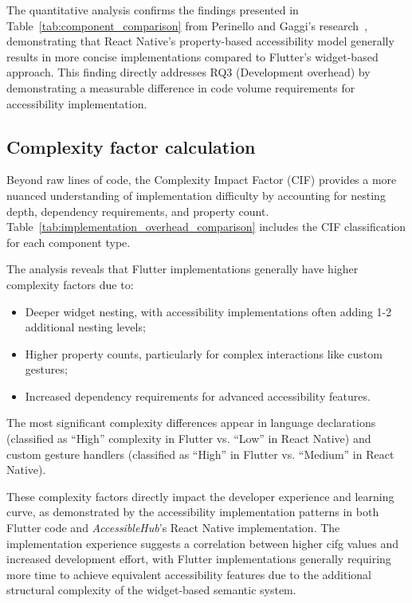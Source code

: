 {The quantitative analysis confirms the findings presented in Table~\ref{tab:component_comparison} from Perinello and Gaggi's research~\cite{perinello2024accessibility}, demonstrating that React Native's property-based accessibility model generally results in more concise implementations compared to Flutter's widget-based approach. This finding directly addresses RQ3 (Development overhead) by demonstrating a measurable difference in code volume requirements for accessibility implementation.

\subsection{Complexity factor calculation}
\label{subsec:complexity-calculation}

Beyond raw lines of code, the Complexity Impact Factor (CIF) provides a more nuanced understanding of implementation difficulty by accounting for nesting depth, dependency requirements, and property count. Table~\ref{tab:implementation_overhead_comparison} includes the CIF classification for each component type.

The analysis reveals that Flutter implementations generally have higher complexity factors due to:

\begin{itemize}
    \item Deeper widget nesting, with accessibility implementations often adding 1-2 additional nesting levels;
    \item Higher property counts, particularly for complex interactions like custom gestures;
    \item Increased dependency requirements for advanced accessibility features.
\end{itemize}

The most significant complexity differences appear in language declarations (classified as ``High'' complexity in Flutter vs. ``Low'' in React Native) and custom gesture handlers (classified as ``High'' in Flutter vs. ``Medium'' in React Native).

These complexity factors directly impact the developer experience and learning curve, as demonstrated by the accessibility implementation patterns in both Flutter code and \textit{AccessibleHub}'s React Native implementation. The implementation experience suggests a correlation between higher \gls{cifg} values and increased development effort, with Flutter implementations generally requiring more time to achieve equivalent accessibility features due to the additional structural complexity of the widget-based semantic system.

}
